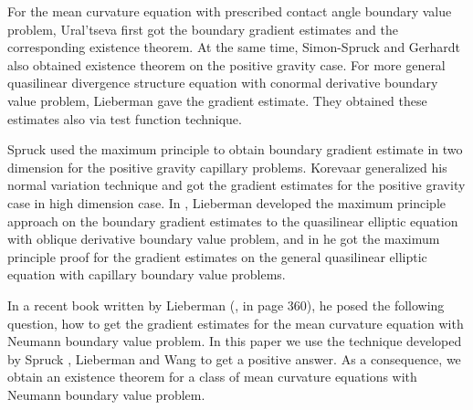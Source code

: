 \documentclass[11pt]{amsart}
\numberwithin{equation}{section}
\begin{document}
  For the  mean curvature equation with prescribed contact angle boundary value problem,  Ural'tseva \cite{Ur73} first got the boundary gradient estimates and the corresponding existence theorem. At the same time, Simon-Spruck \cite{SS76} and Gerhardt \cite{Ger76} also obtained existence theorem on the positive gravity case. For more general quasilinear divergence structure equation with conormal derivative boundary value problem, Lieberman \cite{Lie83}  gave the gradient estimate. They obtained these estimates also via test function technique.

  Spruck \cite{Sp75} used the maximum principle to obtain boundary gradient estimate in two dimension for the positive gravity capillary problems.  Korevaar \cite{Kor88} generalized his normal variation technique and got the gradient estimates for the positive gravity case in high dimension case. In \cite{Lieb84, Lieb87}, Lieberman developed the maximum principle approach on the boundary gradient estimates to the quasilinear elliptic equation with oblique derivative boundary value problem, and in \cite{Lieb88} he got the maximum principle proof for the gradient estimates on the  general quasilinear elliptic equation with capillary boundary value problems.

  In a recent book written by Lieberman (\cite{Lieb13}, in page 360), he posed the following question, how to get the gradient estimates for the mean curvature equation with Neumann boundary value problem. In this paper we use the technique developed by Spruck \cite{Sp75}, Lieberman \cite{Lieb88} and Wang \cite{Wang98} to get a positive answer. As a consequence, we obtain an existence theorem for a class of mean curvature equations with Neumann boundary value problem.
\end{document}
